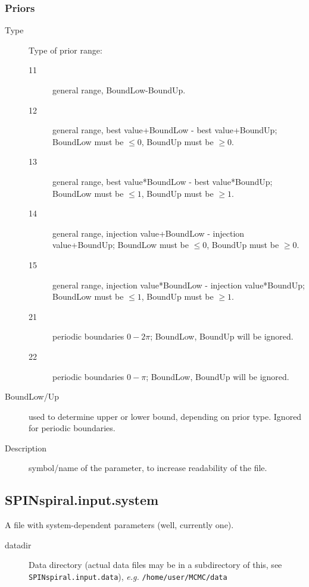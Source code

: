 \subsubsection{Priors}
\begin{description}                
\item[Type] Type of prior range:
  \begin{description}                
  \item[11] general range, BoundLow-BoundUp.
  \item[12] general range, best value+BoundLow - best value+BoundUp; BoundLow must be $\leq 0$, BoundUp must be $\geq 0$.
  \item[13] general range, best value*BoundLow - best value*BoundUp; BoundLow must be $\leq 1$, BoundUp must be $\geq 1$. 
  \item[14] general range, injection value+BoundLow - injection value+BoundUp; BoundLow must be $\leq 0$, BoundUp must be $\geq 0$.
  \item[15] general range, injection value*BoundLow - injection value*BoundUp; BoundLow must be $\leq 1$, BoundUp must be $\geq 1$. 
  \item[21] periodic boundaries $0-2\pi$; BoundLow, BoundUp will be ignored.
  \item[22] periodic boundaries $0-\pi$; BoundLow, BoundUp will be ignored.
  \end{description}                
\item[BoundLow/Up] used to determine upper or lower bound, depending on prior type.  Ignored for periodic boundaries.
\item[Description] symbol/name of the parameter, to increase readability of the file.
\end{description}                



\pagebreak
\subsection{SPINspiral.input.system}
A file with system-dependent parameters (well, currently one).

\begin{description}
\item[datadir] Data directory (actual data files may be in a subdirectory of this, see \texttt{SPINspiral.input.data}), \textit{e.g.} \texttt{/home/user/MCMC/data}
\end{description}







